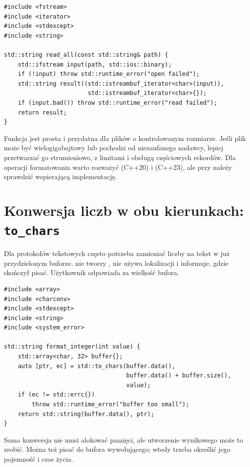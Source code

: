 \begin{lstlisting}[caption={Wczytanie calego pliku binarnego z kontrola bledu (C++20).}]
#include <fstream>
#include <iterator>
#include <stdexcept>
#include <string>

std::string read_all(const std::string& path) {
    std::ifstream input(path, std::ios::binary);
    if (!input) throw std::runtime_error("open failed");
    std::string result((std::istreambuf_iterator<char>(input)),
                        std::istreambuf_iterator<char>{});
    if (input.bad()) throw std::runtime_error("read failed");
    return result;
}
\end{lstlisting}

Funkcja jest prosta i przydatna dla plików o kontrolowanym rozmiarze.
Jeśli plik może być wielogigabajtowy lub pochodzi od niezaufanego
nadawcy, lepiej przetwarzać go strumieniowo, z limitami i obsługą
częściowych rekordów. Dla operacji formatowania warto rozważyć
 (C++20) i  (C++23), ale przy
 należy sprawdzić wspierającą implementację.

\section{Konwersja liczb w obu kierunkach: \texttt{to\_chars}}

Dla protokołów tekstowych często potrzeba zamieniać liczby na tekst
w już przydzielonym buforze.  nie tworzy
, nie używa lokalizacji i informuje, gdzie skończył
pisać. Użytkownik odpowiada za wielkość bufora.

\begin{lstlisting}[caption={Formatowanie liczby calkowitej bez alokacji (C++17).}]
#include <array>
#include <charconv>
#include <stdexcept>
#include <string>
#include <system_error>

std::string format_integer(int value) {
    std::array<char, 32> buffer{};
    auto [ptr, ec] = std::to_chars(buffer.data(),
                                   buffer.data() + buffer.size(),
                                   value);
    if (ec != std::errc{})
        throw std::runtime_error("buffer too small");
    return std::string(buffer.data(), ptr);
}
\end{lstlisting}

Sama konwersja nie musi alokować pamięci, ale utworzenie wynikowego
 może to zrobić. Można też pisać do bufora
wywołującego; wtedy trzeba określić jego pojemność i czas życia.

